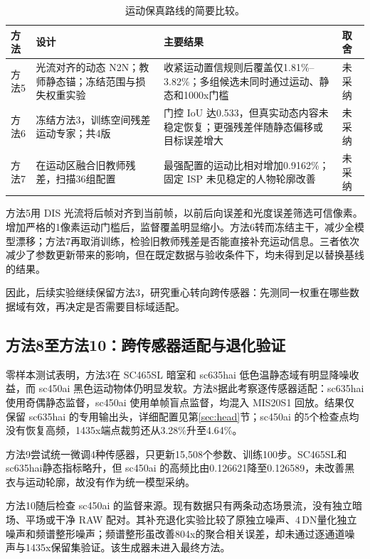 \documentclass[11pt,a4paper,UTF8,fontset=fandol]{ctexart}
\newcommand{\dn}{\ensuremath{\,\mathrm{DN}}}
\begin{document}
\begin{table}[H]
\centering\small
\caption{运动保真路线的简要比较。}
\label{tab:motion_trials}
\begin{tabular}{P{0.10\textwidth}P{0.30\textwidth}P{0.38\textwidth}P{0.10\textwidth}}
\toprule
方法 & 设计 & 主要结果 & 取舍 \\
\midrule
方法5 & 光流对齐的动态 N2N；教师静态锚；冻结范围与损失权重实验 & 收紧运动置信规则后覆盖仅1.81\%--3.82\%；多组候选未同时通过运动、静态和1000x门槛 & 未采纳 \\
方法6 & 冻结方法3，训练空间残差运动专家；共4版 & 门控 IoU 达0.533，但真实动态内容未稳定恢复；更强残差伴随静态偏移或目标误差增大 & 未采纳 \\
方法7 & 在运动区融合旧教师残差，扫描36组配置 & 最强配置的运动比相对增加0.9162\%；固定 ISP 未见稳定的人物轮廓改善 & 未采纳 \\
\bottomrule
\end{tabular}
\end{table}

方法5用 DIS 光流将后帧对齐到当前帧，以前后向误差和光度误差筛选可信像素。增加严格的1像素运动门槛后，监督覆盖明显缩小。方法6转而冻结主干，减少全模型漂移；方法7再取消训练，检验旧教师残差是否能直接补充运动信息。三者依次减少了参数更新带来的影响，但在既定数据与验收条件下，均未得到足以替换基线的结果。

因此，后续实验继续保留方法3，研究重心转向跨传感器：先测同一权重在哪些数据域有效，再决定是否需要目标域适配。

\subsection{方法8至方法10：跨传感器适配与退化验证}

零样本测试表明，方法3在 SC465SL 暗室和 sc635hai 低色温静态域有明显降噪收益，而 sc450ai 黑色运动物体仍明显发软。方法8据此考察逐传感器适配：sc635hai 使用奇偶静态监督，sc450ai 使用单帧盲点监督，均混入 MIS20S1 回放。结果仅保留 sc635hai 的专用输出头，详细配置见第\ref{sec:head}节；sc450ai 的5个检查点均没有恢复高频，1435x端点裁剪还从3.28\%升至4.64\%。

方法9尝试统一微调4种传感器，只更新15,508个参数、训练100步。SC465SL和sc635hai静态指标略升，但 sc450ai 的高频比由0.126621降至0.126589，未改善黑衣与运动轮廓，故没有作为统一模型采纳。

方法10随后检查 sc450ai 的监督来源。现有数据只有两条动态场景流，没有独立暗场、平场或干净 RAW 配对。其补充退化实验比较了原独立噪声、4\dn{}量化独立噪声和频谱整形噪声；频谱整形虽改善804x的聚合相关误差，却未通过逐通道噪声与1435x保留集验证。该生成器未进入最终方法。
\end{document}
